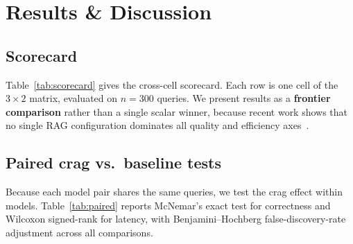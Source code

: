 
\section{Results \& Discussion}
\label{sec:results}


\subsection{Scorecard}

Table~\ref{tab:scorecard} gives the cross-cell scorecard. Each row is one
cell of the $3 \times 2$ matrix, evaluated on $n=300$ queries. We present
results as a \textbf{frontier comparison} rather than a single scalar
winner, because recent work shows that no single RAG configuration
dominates all quality and efficiency axes~\cite{sharma2025survey,brown2025systematic}.




\subsection{Paired crag vs.\ baseline tests}

Because each model pair shares the same queries, we test the crag effect
within models. Table~\ref{tab:paired} reports McNemar's exact test for
correctness and Wilcoxon signed-rank for latency, with Benjamini--Hochberg
false-discovery-rate adjustment across all comparisons.




